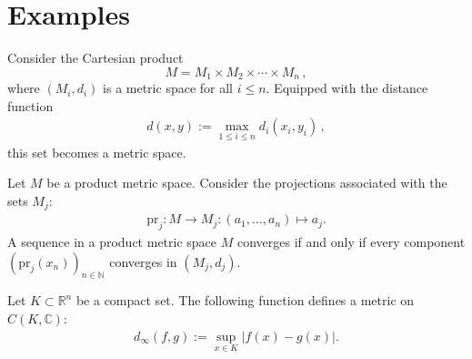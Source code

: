 
\section{Examples}

    \begin{example}
        Consider the Cartesian product \[M = M_1\times M_2\times\cdots\times M_n\,,\] where $(M_i,d_i)$ is a metric space for all $i\leq n$. Equipped with the distance function
        \begin{gather}
            d(x,y) := \max_{1\leq i\leq n}d_i(x_i,y_i)\,,
        \end{gather}
        this set becomes a metric space.
    \end{example}
    \begin{property}\label{metric:projection}
        Let $M$ be a product metric space. Consider the projections associated with the sets $M_j$:
        \begin{gather}
            \mathrm{pr}_j:M\rightarrow M_j:(a_1,\ldots,a_n)\mapsto a_j.
        \end{gather}
        A sequence in a product metric space $M$ converges if and only if every component $(\mathrm{pr}_j(x_n))_{n\in\mathbb{N}}$ converges in $(M_j,d_j)$.
    \end{property}

    \begin{example}\label{metric:supremum_distance}
        Let $K\subset\mathbb{R}^n$ be a compact set. The following function defines a metric on $C(K,\mathbb{C})$:
        \begin{gather}
            d_\infty(f,g) := \sup_{x\in K}|f(x) - g(x)|.
        \end{gather}
    \end{example}


